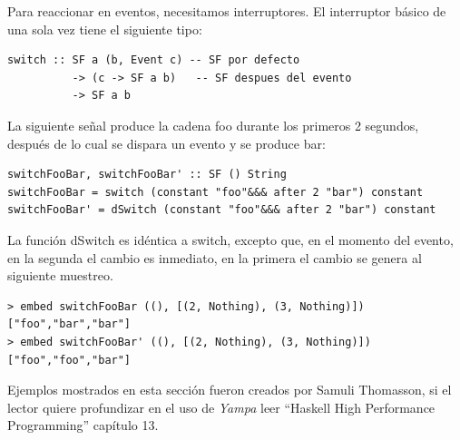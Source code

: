 Para reaccionar en eventos, necesitamos interruptores. El interruptor básico de una sola vez tiene el siguiente tipo:

\begin{lstlisting}[frame=single]
switch :: SF a (b, Event c) -- SF por defecto
          -> (c -> SF a b)   -- SF despues del evento
          -> SF a b
\end{lstlisting}

La siguiente señal produce la cadena foo durante los primeros 2 segundos, después de lo cual se dispara un evento y se produce bar:

\begin{lstlisting}[frame=single]
switchFooBar, switchFooBar' :: SF () String
switchFooBar = switch (constant "foo"&&& after 2 "bar") constant
switchFooBar' = dSwitch (constant "foo"&&& after 2 "bar") constant
\end{lstlisting}

La función dSwitch es idéntica a switch, excepto que, en el momento del evento, en la segunda el cambio es inmediato, en la primera el cambio se genera al siguiente muestreo.

\begin{lstlisting}[frame=single]
> embed switchFooBar ((), [(2, Nothing), (3, Nothing)])
["foo","bar","bar"]
> embed switchFooBar' ((), [(2, Nothing), (3, Nothing)])
["foo","foo","bar"]
\end{lstlisting}

Ejemplos mostrados en esta sección fueron creados por Samuli Thomasson, si el lector quiere profundizar en el uso de \emph{Yampa} leer ``Haskell High Performance Programming'' \cite{thomasson2016haskell} capítulo 13.
